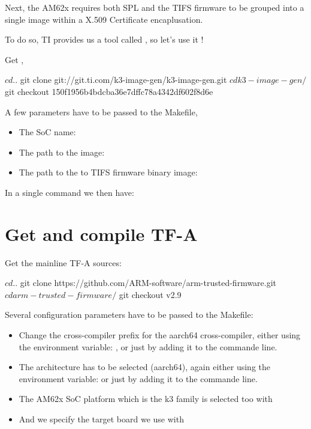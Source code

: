 Next, the AM62x requires both SPL and the TIFS firmware to be grouped into a
single image within a X.509 Certificate encaplusation.

To do so, TI provides us a tool called , so let's use it !

Get ,
\begin{bashinput}
$ cd ..
$ git clone git://git.ti.com/k3-image-gen/k3-image-gen.git
$ cd k3-image-gen/
$ git checkout 150f1956b4bdcba36e7dffc78a4342df602f8d6e
\end{bashinput}

A few parameters have to be passed to the Makefile,
\begin{itemize}
\item The SoC name: 
\item The path to the  image:
\item The path to the to TIFS firmware binary image:
\end{itemize}

In a single command we then have:


\section{Get and compile TF-A}
Get the mainline TF-A sources:

\begin{bashinput}
$ cd ..
$ git clone https://github.com/ARM-software/arm-trusted-firmware.git
$ cd arm-trusted-firmware/
$ git checkout v2.9
\end{bashinput}

Several configuration parameters have to be passed to the Makefile:
\begin{itemize}
\item Change the cross-compiler prefix for the aarch64 cross-compiler,
      either using the environment variable:
      , or just by
      adding it to the  commande line.
\item The architecture has to be selected (aarch64),
      again either using the environment variable: 
      or just by adding it to the  commande line.
\item The AM62x SoC platform which is the k3 family is selected
      too with 
\item And we specify the target board we use with 
\end{itemize}

